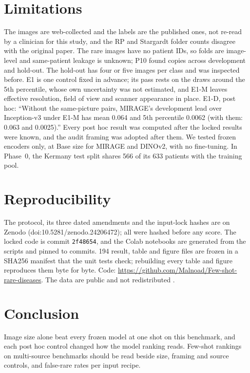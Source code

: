 \documentclass[conference]{IEEEtran}
\begin{document}
\section{Limitations}
The images are web-collected and the labels are the published ones, not re-read by a clinician for this study, and the RP and Stargardt folder counts disagree with the original paper. The rare images have no patient IDs, so folds are image-level and same-patient leakage is unknown; P10 found copies across development and hold-out. The hold-out has four or five images per class and was inspected before. E1 is one control fixed in advance; its pass rests on the draws around the 5th percentile, whose own uncertainty was not estimated, and E1-M leaves effective resolution, field of view and scanner appearance in place. E1-D, post hoc: ``Without the same-picture pairs, MIRAGE's development lead over Inception-v3 under E1-M has mean 0.064 and 5th percentile 0.0062 (with them: 0.063 and 0.0025).'' Every post hoc result was computed after the locked results were known, and the audit framing was adopted after them. We tested frozen encoders only, at Base size for MIRAGE and DINOv2, with no fine-tuning. In Phase~0, the Kermany test split shares 566 of its 633 patients with the training pool.

\section{Reproducibility}
The protocol, its three dated amendments and the input-lock hashes are on Zenodo (doi:10.5281/zenodo.24206472); all were hashed before any score. The locked code is commit \texttt{2f48654}, and the Colab notebooks are generated from the scripts and pinned to commits. 194 result, table and figure files are frozen in a SHA256 manifest that the unit tests check; rebuilding every table and figure reproduces them byte for byte. Code: \url{https://github.com/Malnoad/Few-shot-rare-diseases}. The data are public and not redistributed \cite{Kermany2018,Yoo2021,OCTID2020,OCTDL2024}.

\section{Conclusion}
Image size alone beat every frozen model at one shot on this benchmark, and each post hoc control changed how the model ranking reads. Few-shot rankings on multi-source benchmarks should be read beside size, framing and source controls, and false-rare rates per input recipe.
\end{document}
